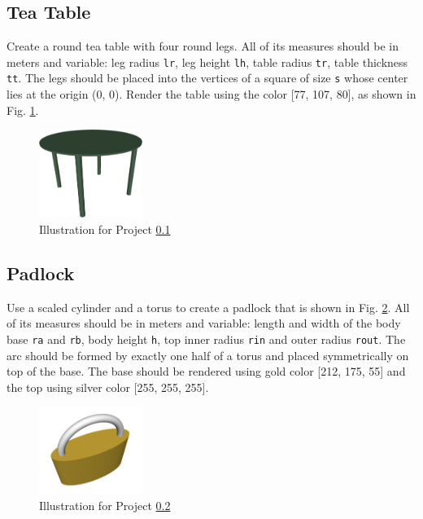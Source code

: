 \subsection{Tea Table} \label{3.2}
Create a round tea table with four round legs. All of its measures should be 
in meters and variable: leg radius {\tt lr}, leg height {\tt lh}, table radius 
{\tt tr}, table thickness {\tt tt}. The legs should be placed into the 
vertices of a square of size {\tt s} whose center lies at the origin (0, 0).
Render the table using the color [77, 107, 80], as shown in Fig. \ref{fig:b2}.


\begin{figure}[!ht]
\begin{center}
\includegraphics[width=0.3\textwidth]{img/teatable.png}
\end{center}
\vspace{-2mm}
\caption{Illustration for Project \ref{3.2}}
\label{fig:b2}
\end{figure}



\subsection{Padlock} \label{3.3}
Use a scaled cylinder and a torus to create a padlock that is shown in Fig. \ref{fig:b3}. 
All of its measures should be in meters and variable: length and width of the body base 
{\tt ra} and {\tt rb}, body height {\tt h}, top inner radius {\tt rin}
and outer radius {\tt rout}. The arc should be formed by exactly one half of
a torus and placed symmetrically on top of the base. The base should be rendered using 
gold color [212, 175, 55] and the top using silver color [255, 255, 255].

\begin{figure}[!ht]
\begin{center}
\includegraphics[width=0.3\textwidth]{img/padlock.png}
\end{center}
\vspace{-2mm}
\caption{Illustration for Project \ref{3.3}}
\label{fig:b3}
\end{figure}


